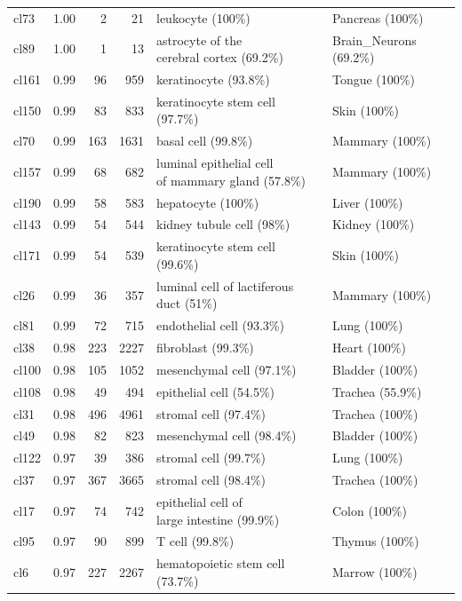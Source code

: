 \begin{table}[ht!]
\begin{tabular}{lrrrll}
  cl73 & 1.00 &   2 &  21 & leukocyte (100\%) & Pancreas (100\%) \\ 
  cl89 & 1.00 &   1 &  13 & \specialcell[t]{astrocyte of the\\cerebral cortex (69.2\%)} & Brain\_Neurons (69.2\%) \\ 
  cl161 & 0.99 &  96 & 959 & keratinocyte (93.8\%) & Tongue (100\%) \\ 
  cl150 & 0.99 &  83 & 833 & keratinocyte stem cell (97.7\%) & Skin (100\%) \\ 
  cl70 & 0.99 & 163 & 1631 & basal cell (99.8\%) & Mammary (100\%) \\ 
  cl157 & 0.99 &  68 & 682 & \specialcell[t]{luminal epithelial cell\\of mammary gland (57.8\%)} & Mammary (100\%) \\ 
  cl190 & 0.99 &  58 & 583 & hepatocyte (100\%) & Liver (100\%) \\ 
  cl143 & 0.99 &  54 & 544 & kidney tubule cell (98\%) & Kidney (100\%) \\ 
  cl171 & 0.99 &  54 & 539 & keratinocyte stem cell (99.6\%) & Skin (100\%) \\ 
  cl26 & 0.99 &  36 & 357 & luminal cell of lactiferous duct (51\%) & Mammary (100\%) \\ 
  cl81 & 0.99 &  72 & 715 & endothelial cell (93.3\%) & Lung (100\%) \\ 
  cl38 & 0.98 & 223 & 2227 & fibroblast (99.3\%) & Heart (100\%) \\ 
  cl100 & 0.98 & 105 & 1052 & mesenchymal cell (97.1\%) & Bladder (100\%) \\ 
  cl108 & 0.98 &  49 & 494 & epithelial cell (54.5\%) & Trachea (55.9\%) \\ 
  cl31 & 0.98 & 496 & 4961 & stromal cell (97.4\%) & Trachea (100\%) \\ 
  cl49 & 0.98 &  82 & 823 & mesenchymal cell (98.4\%) & Bladder (100\%) \\ 
  cl122 & 0.97 &  39 & 386 & stromal cell (99.7\%) & Lung (100\%) \\ 
  cl37 & 0.97 & 367 & 3665 & stromal cell (98.4\%) & Trachea (100\%) \\ 
  cl17 & 0.97 &  74 & 742 & \specialcell[t]{epithelial cell of\\large intestine (99.9\%)} & Colon (100\%) \\ 
  cl95 & 0.97 &  90 & 899 & T cell (99.8\%) & Thymus (100\%) \\ 
  cl6 & 0.97 & 227 & 2267 & hematopoietic stem cell (73.7\%) & Marrow (100\%) \\ 

\end{tabular}
\end{table}
